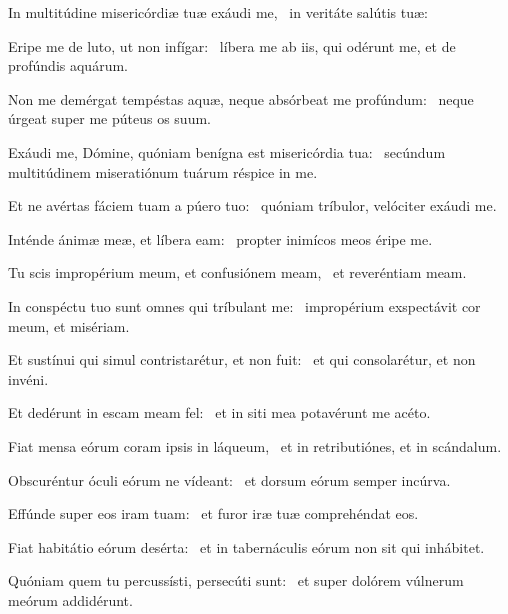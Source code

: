 \item In multitúdine misericórdiæ tuæ exáudi me,~\psstar{} in veritáte salútis tuæ:

\item Eripe me de luto, ut non infígar:~\psstar{} líbera me ab iis, qui odérunt me, et de profúndis aquárum.

\item Non me demérgat tempéstas aquæ, neque absórbeat me profúndum:~\psstar{} neque úrgeat super me púteus os suum.

\item Exáudi me, Dómine, quóniam benígna est misericórdia tua:~\psstar{} secúndum multitúdinem miseratiónum tuárum réspice in me.

\item Et ne avértas fáciem tuam a púero tuo:~\psstar{} quóniam tríbulor, velóciter exáudi me.

\item Inténde ánimæ meæ, et líbera eam:~\psstar{} propter inimícos meos éripe me.

\item Tu scis impropérium meum, et confusiónem meam,~\psstar{} et reveréntiam meam.

\item In conspéctu tuo sunt omnes qui tríbulant me:~\psstar{} impropérium exspectávit cor meum, et misériam.

\item Et sustínui qui simul contristarétur, et non fuit:~\psstar{} et qui consolarétur, et non invéni.

\item Et dedérunt in escam meam fel:~\psstar{} et in siti mea potavérunt me acéto.

\item Fiat mensa eórum coram ipsis in láqueum,~\psstar{} et in retributiónes, et in scándalum.

\item Obscuréntur óculi eórum ne vídeant:~\psstar{} et dorsum eórum semper incúrva.

\item Effúnde super eos iram tuam:~\psstar{} et furor iræ tuæ comprehéndat eos.

\item Fiat habitátio eórum desérta:~\psstar{} et in tabernáculis eórum non sit qui inhábitet.

\item Quóniam quem tu percussísti, persecúti sunt:~\psstar{} et super dolórem vúlnerum meórum addidérunt.

